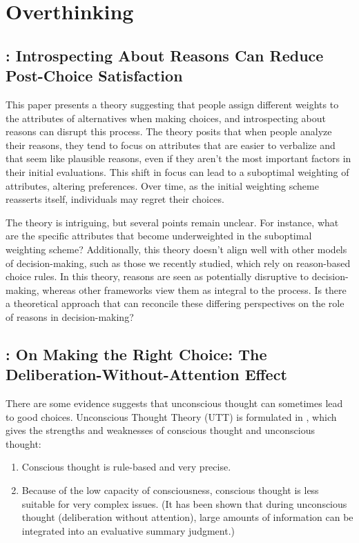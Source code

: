 \documentclass[11pt]{elegantbook}
\begin{document}
\chapter{Overthinking}
\section{\cite{wilson1993introspecting}: Introspecting About Reasons Can Reduce Post-Choice Satisfaction}
This paper presents a theory suggesting that people assign different weights to the attributes of alternatives when making choices, and introspecting about reasons can disrupt this process. The theory posits that when people analyze their reasons, they tend to focus on attributes that are easier to verbalize and that seem like plausible reasons, even if they aren’t the most important factors in their initial evaluations. This shift in focus can lead to a suboptimal weighting of attributes, altering preferences. Over time, as the initial weighting scheme reasserts itself, individuals may regret their choices.

The theory is intriguing, but several points remain unclear. For instance, what are the specific attributes that become underweighted in the suboptimal weighting scheme? Additionally, this theory doesn’t align well with other models of decision-making, such as those we recently studied, which rely on reason-based choice rules. In this theory, reasons are seen as potentially disruptive to decision-making, whereas other frameworks view them as integral to the process. Is there a theoretical approach that can reconcile these differing perspectives on the role of reasons in decision-making?

\section{\cite{dijksterhuis2006making}: On Making the Right Choice: The Deliberation-Without-Attention Effect}
There are some evidence suggests that unconscious thought can sometimes lead to good choices. Unconscious Thought Theory (UTT) is formulated in \cite{dijksterhuis2006theory}, which gives the strengths and weaknesses of conscious thought and unconscious thought:
\begin{enumerate}
    \item Conscious thought is rule-based and very precise.
    \item Because of the low capacity of consciousness, conscious thought is less suitable for very complex issues. (It has been shown that during unconscious thought (deliberation without attention), large amounts of information can be integrated into an evaluative summary judgment.)
\end{enumerate}
\end{document}
